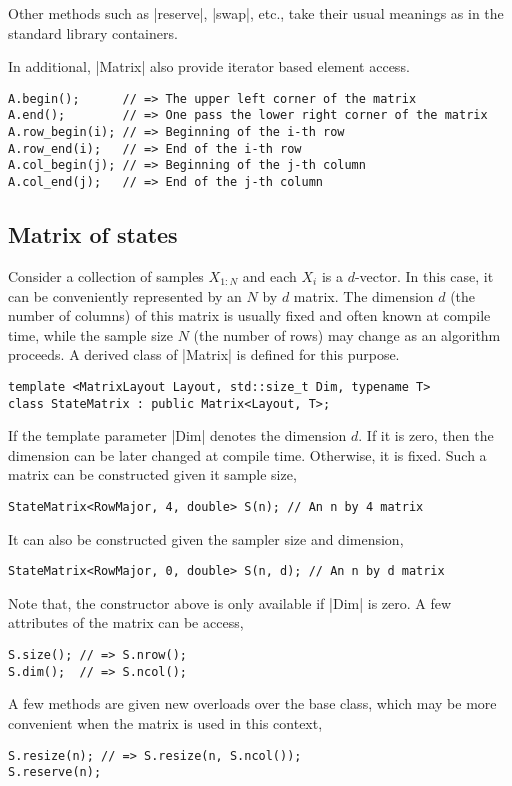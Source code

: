 Other methods such as |reserve|, |swap|, etc., take their usual meanings as in
the standard library containers.

In additional, |Matrix| also provide iterator based element access.
\begin{verbatim}
A.begin();      // => The upper left corner of the matrix
A.end();        // => One pass the lower right corner of the matrix
A.row_begin(i); // => Beginning of the i-th row
A.row_end(i);   // => End of the i-th row
A.col_begin(j); // => Beginning of the j-th column
A.col_end(j);   // => End of the j-th column
\end{verbatim}

\subsection{Matrix of states}
\label{sub:Matrix of states}

Consider a collection of samples $X_{1:N}$ and each $X_i$ is a $d$-vector. In
this case, it can be conveniently represented by an $N$ by $d$ matrix. The
dimension $d$ (the number of columns) of this matrix is usually fixed and often
known at compile time, while the sample size $N$ (the number of rows) may
change as an algorithm proceeds. A derived class of |Matrix| is defined for
this purpose.
\begin{verbatim}
template <MatrixLayout Layout, std::size_t Dim, typename T>
class StateMatrix : public Matrix<Layout, T>;
\end{verbatim}
If the template parameter |Dim| denotes the dimension $d$. If it is zero, then
the dimension can be later changed at compile time. Otherwise, it is fixed.
Such a matrix can be constructed given it sample size,
\begin{verbatim}
StateMatrix<RowMajor, 4, double> S(n); // An n by 4 matrix
\end{verbatim}
It can also be constructed given the sampler size and dimension,
\begin{verbatim}
StateMatrix<RowMajor, 0, double> S(n, d); // An n by d matrix
\end{verbatim}
Note that, the constructor above is only available if |Dim| is zero. A few
attributes of the matrix can be access,
\begin{verbatim}
S.size(); // => S.nrow();
S.dim();  // => S.ncol();
\end{verbatim}
A few methods are given new overloads over the base class, which may be more
convenient when the matrix is used in this context,
\begin{verbatim}
S.resize(n); // => S.resize(n, S.ncol());
S.reserve(n);
\end{verbatim}

